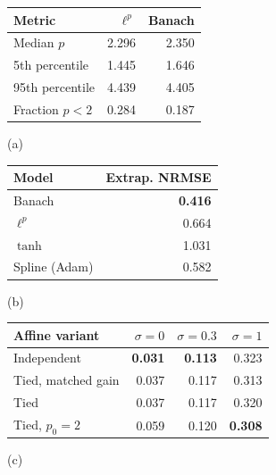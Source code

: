 \begin{minipage}[t]{.56\linewidth}\vspace{0pt}\centering
\begin{tabular}{lrr}
\toprule
Metric & $\ell^p$ & Banach \\
\midrule
Median $p$ & 2.296 & 2.350 \\
5th percentile & 1.445 & 1.646 \\
95th percentile & 4.439 & 4.405 \\
Fraction $p<2$ & 0.284 & 0.187 \\
\bottomrule\end{tabular}\par\smallskip (a)\end{minipage}\hfill
\begin{minipage}[t]{.38\linewidth}\vspace{0pt}\centering
\begin{tabular}{lr}
\toprule
Model & Extrap. NRMSE \\
\midrule
Banach & \textbf{0.416} \\
$\ell^p$ & 0.664 \\
$\tanh$ & 1.031 \\
Spline (Adam) & 0.582 \\
\bottomrule\end{tabular}\par\smallskip (b)\end{minipage}\par\medskip
\begin{tabular}{lrrr}
\toprule
Affine variant & $\sigma=0$ & $\sigma=0.3$ & $\sigma=1$ \\
\midrule
Independent & \textbf{0.031} & \textbf{0.113} & 0.323 \\
Tied, matched gain & 0.037 & 0.117 & 0.313 \\
Tied & 0.037 & 0.117 & 0.320 \\
Tied, $p_0=2$ & 0.059 & 0.120 & \textbf{0.308} \\
\bottomrule\end{tabular}
\par\smallskip (c)
